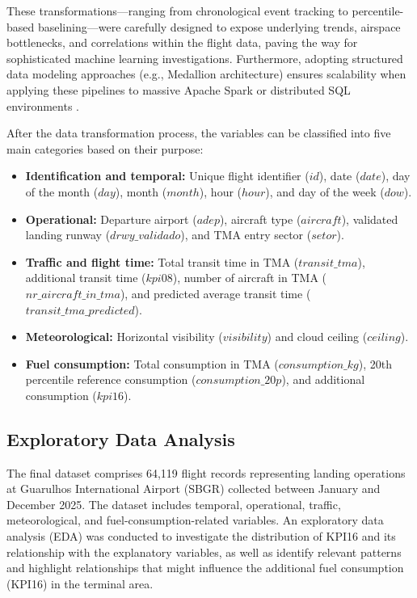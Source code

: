 These transformations—ranging from chronological event tracking to percentile-based baselining—were carefully designed to expose underlying trends, airspace bottlenecks, and correlations within the flight data, paving the way for sophisticated machine learning investigations. Furthermore, adopting structured data modeling approaches (e.g., Medallion architecture) ensures scalability when applying these pipelines to massive Apache Spark or distributed SQL environments \cite{databricks_medallion, saha_dataeng}.

After the data transformation process, the variables can be classified into five main categories based on their purpose:
\begin{itemize}
    \item \textbf{Identification and temporal:} Unique flight identifier ($id$), date ($date$), day of the month ($day$), month ($month$), hour ($hour$), and day of the week ($dow$).
    \item \textbf{Operational:} Departure airport ($adep$), aircraft type ($aircraft$), validated landing runway ($drwy\_validado$), and TMA entry sector ($setor$).
    \item \textbf{Traffic and flight time:} Total transit time in TMA ($transit\_tma$), additional transit time ($kpi08$), number of aircraft in TMA ($nr\_aircraft\_in\_tma$), and predicted average transit time ($transit\_tma\_predicted$).
    \item \textbf{Meteorological:} Horizontal visibility ($visibility$) and cloud ceiling ($ceiling$).
    \item \textbf{Fuel consumption:} Total consumption in TMA ($consumption\_kg$), 20th percentile reference consumption ($consumption\_20p$), and additional consumption ($kpi16$).
\end{itemize}

\subsection{Exploratory Data Analysis}
The final dataset comprises 64,119 flight records representing landing operations at Guarulhos International Airport (SBGR) collected between January and December 2025. The dataset includes temporal, operational, traffic, meteorological, and fuel-consumption-related variables. An exploratory data analysis (EDA) was conducted to investigate the distribution of KPI16 and its relationship with the explanatory variables, as well as identify relevant patterns and highlight relationships that might influence the additional fuel consumption (KPI16) in the terminal area.

